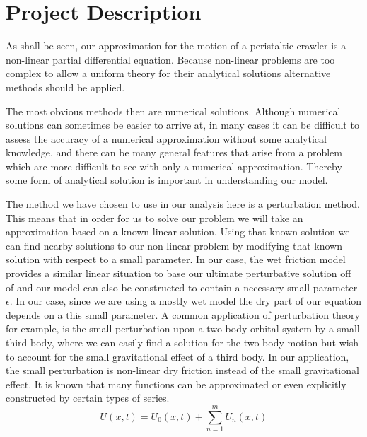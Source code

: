 \documentclass{article}
\begin{document}
\maketitle

\section{Project Description}
\par As shall be seen, our approximation for the motion of a peristaltic crawler is a non-linear partial differential equation. Because non-linear problems are too complex to allow a uniform theory for their analytical solutions alternative methods should be applied. 
\par The most obvious methods then are numerical solutions. Although numerical solutions can sometimes be easier to arrive at, in many cases it can be difficult to assess the accuracy of a numerical approximation without some analytical knowledge, and there can be many general features that arise from a problem which are more difficult to see with only a numerical approximation. Thereby some form of analytical solution is important in understanding our model.
\par The method we have chosen to use in our analysis here is a perturbation method. This means that in order for us to solve our problem we will take an approximation based on a known linear solution. Using that known solution we can find nearby solutions to our non-linear problem by modifying that known solution with respect to a small parameter.  In our case, the wet friction model provides a similar linear situation to base our ultimate perturbative solution off of and our model can also be constructed to contain a necessary small parameter $\epsilon$. In our case, since we are using a mostly wet model the dry part of our equation depends on a this small parameter. A common application of perturbation theory for example, is the small perturbation upon a two body orbital system by a small third body, where we can easily find a solution for the two body motion but wish to account for the small gravitational effect of a third body. In our application, the small perturbation is non-linear dry friction instead of the small gravitational effect. It is known that many functions can be approximated or even explicitly constructed by certain types of series. 
\begin{equation}
    U(x,t) = U_0(x,t) + \sum_{n=1}^{m} U_n(x,t)
    \label{eq:example_label}
\end{equation}
\end{document}

